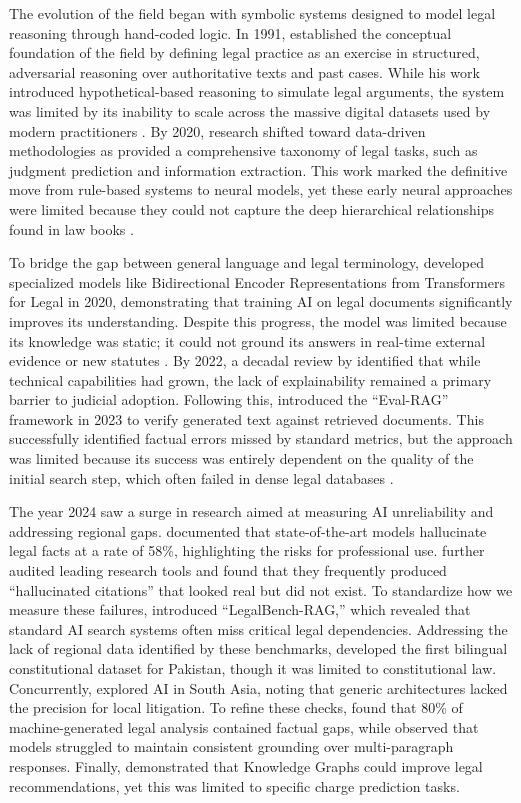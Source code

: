 The evolution of the field began with symbolic systems designed to model legal reasoning
through hand-coded logic. In 1991, \cite{r9} established the conceptual foundation of
the field by defining legal practice as an exercise in structured, adversarial reasoning
over authoritative texts and past cases. While his work introduced hypothetical-based
reasoning to simulate legal arguments, the system was limited by its inability to scale
across the massive digital datasets used by modern practitioners \cite{r9}. By 2020,
research shifted toward data-driven methodologies as \cite{r226} provided a
comprehensive taxonomy of legal tasks, such as judgment prediction and information
extraction. This work marked the definitive move from rule-based systems to neural
models, yet these early neural approaches were limited because they could not capture
the deep hierarchical relationships found in law books \cite{r226}.

To bridge the gap between general language and legal terminology, \cite{r171} developed
specialized models like Bidirectional Encoder Representations from Transformers for
Legal in 2020, demonstrating that training AI on legal documents significantly improves
its understanding. Despite this progress, the model was limited because its knowledge
was static; it could not ground its answers in real-time external evidence or new
statutes \cite{r171}. By 2022, a decadal review by \cite{r223} identified that while
technical capabilities had grown, the lack of explainability remained a primary barrier
to judicial adoption. Following this, \cite{r130} introduced the ``Eval-RAG'' framework
in 2023 to verify generated text against retrieved documents. This successfully
identified factual errors missed by standard metrics, but the approach was limited
because its success was entirely dependent on the quality of the initial search step,
which often failed in dense legal databases \cite{r130}.

The year 2024 saw a surge in research aimed at measuring AI unreliability and addressing
regional gaps. \cite{r88} documented that state-of-the-art models hallucinate legal
facts at a rate of 58\%, highlighting the risks for professional use. \cite{r40} further
audited leading research tools and found that they frequently produced ``hallucinated
citations'' that looked real but did not exist. To standardize how we measure these
failures, \cite{r188} introduced ``LegalBench-RAG,'' which revealed that standard AI
search systems often miss critical legal dependencies. Addressing the lack of regional
data identified by these benchmarks, \cite{r43} developed the first bilingual
constitutional dataset for Pakistan, though it was limited to constitutional law.
Concurrently, \cite{r58} explored AI in South Asia, noting that generic architectures
lacked the precision for local litigation. To refine these checks, \cite{r162} found
that 80\% of machine-generated legal analysis contained factual gaps, while \cite{r27}
observed that models struggled to maintain consistent grounding over multi-paragraph
responses. Finally, \cite{r104} demonstrated that Knowledge Graphs could improve legal
recommendations, yet this was limited to specific charge prediction tasks.

